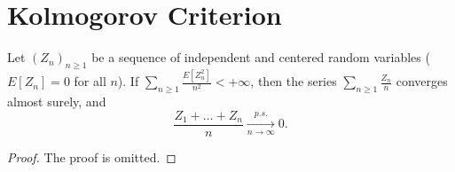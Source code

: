 \section{Kolmogorov Criterion}%
\begin{proposition}
Let $(Z_n)_{n \ge 1}$ be a sequence of independent and centered random variables ($E[Z_n]=0$ for all $n$).
If $\sum_{n \ge 1} \frac{E[Z_n^2]}{n^2} < +\infty$, then the series $\sum_{n \ge 1} \frac{Z_n}{n}$ converges almost surely, and
\[
\frac{Z_1 + \dots + Z_n}{n} \xrightarrow[n\to\infty]{p.s.} 0.
\]
\end{proposition}%
\begin{proof}
The proof is omitted.
\end{proof}
